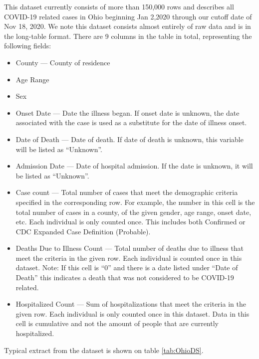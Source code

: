 \documentclass[conference]{IEEEtran}
\begin{document}
	This dataset currently consists of more
        than 150,000 rows and describes all COVID-19 related cases in Ohio beginning Jan 2,2020 through our cutoff date of Nov 18, 2020. We note this dataset consists almost entirely of raw data and is in the long-table format. There are 9 columns in the table in total, representing the following fields:
        \begin{itemize}
        \item County --- County of residence
        \item Age Range
         \item Sex
        \item Onset Date --- Date the illness began. If onset date is unknown, the date associated with the case is used as a substitute for the date of illness onset.
        \item Date of Death --- Date of death. If date of death is unknown, this variable will be listed as “Unknown”.
        \item Admission Date --- Date of hospital admission. If the date is unknown, it will be listed as “Unknown”.
        \item Case count --- Total number of cases that meet the demographic criteria specified in the corresponding row. For example, the number in this cell is the total number of cases in a county, of the given gender, age range, onset date, etc. Each individual is only counted once. This includes both Confirmed or CDC Expanded Case Definition (Probable).
        \item Deaths Due to Illness Count --- Total number of deaths due to illness that meet the criteria in the given row. Each individual is counted once in this dataset. Note: If this cell is “0” and there is a date listed under “Date of Death” this indicates a death that was not considered to be COVID-19 related.
        \item Hospitalized Count --- Sum of hospitalizations that meet the criteria in the given row. Each individual is only counted once in this dataset. Data in this cell is cumulative and not the amount of people that are currently hospitalized.
        \end{itemize}
Typical extract from the dataset is shown on table \ref{tab:OhioDS}.
\end{document}
